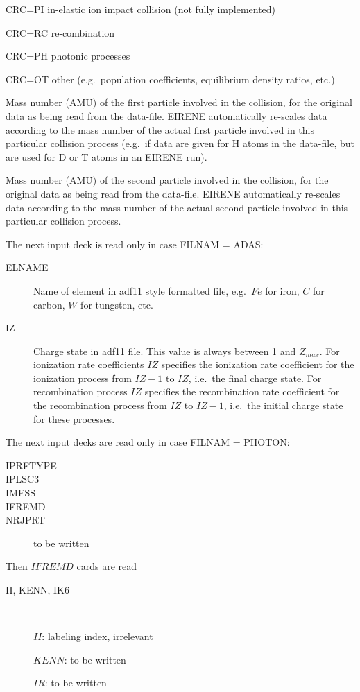 \begin{description}
        CRC=PI in-elastic ion impact collision (not fully implemented)

        CRC=RC re-combination

        CRC=PH photonic processes

        CRC=OT other  (e.g.\ population coefficients, equilibrium density ratios, etc.)
  \item[MASSP] Mass number (\ac{AMU}) of the first particle involved in the
        collision, for the original data as being read from the data-file.
        EIRENE automatically re-scales data according to the mass number of the actual
        first particle involved in this particular collision process (e.g.\ if data are
        given for H atoms in the data-file, but are used for D or T atoms in an EIRENE
        run).
  \item[MASST] Mass number (\ac{AMU}) of the second particle involved in the
        collision, for the original data as being read from the data-file.
        EIRENE automatically re-scales data according to the mass number of the actual
        second particle involved in this particular collision process.
\end{description}
The next input deck is read only in case FILNAM = ADAS:
\begin{description}
  \item[ELNAME] Name of element in adf11 style formatted file, e.g.\ $Fe$ for
        iron, $C$ for carbon, $W$ for tungsten, etc.
  \item[IZ] Charge state in adf11
        file.
        This value is always between 1 and $Z_{max}$.
        For ionization rate coefficients $IZ$ specifies the ionization rate coefficient
        for the ionization process from $IZ-1$ to $IZ$, i.e.\ the final charge state.
        For recombination process $IZ$ specifies the recombination rate coefficient for
        the recombination process from $IZ$ to $IZ-1$, i.e.\ the initial charge state
        for these processes.
\end{description}
The next input decks are read only in case FILNAM = PHOTON:
\begin{description}
  \item[IPRFTYPE]
  \item[IPLSC3]
  \item[IMESS]
  \item[IFREMD]
  \item[NRJPRT] to be
        written
\end{description}
Then $IFREMD$ cards are read
\begin{description}
  \item[II, KENN,  IK6] ~

        $II$: labeling index, irrelevant

        $KENN$: to be written

        $IR$: to be written
\end{description}

